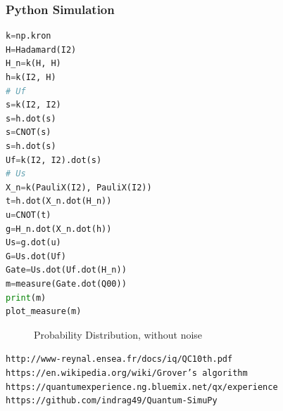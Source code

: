 \documentclass{article}
\begin{document}
\subsubsection{Python Simulation}
\begin{lstlisting}[frame=single, language=Python]
k=np.kron
H=Hadamard(I2)
H_n=k(H, H)
h=k(I2, H)
# Uf
s=k(I2, I2)
s=h.dot(s)
s=CNOT(s)
s=h.dot(s)
Uf=k(I2, I2).dot(s)
# Us
X_n=k(PauliX(I2), PauliX(I2))
t=h.dot(X_n.dot(H_n))
u=CNOT(t)
g=H_n.dot(X_n.dot(h))
Us=g.dot(u)
G=Us.dot(Uf)
Gate=Us.dot(Uf.dot(H_n))
m=measure(Gate.dot(Q00))
print(m)
plot_measure(m)
\end{lstlisting}
\begin{figure}[H]
\centering 
\noindent{}%
\caption{Probability Distribution, without noise}
\end{figure}
\begin{thebibliography}{9}
\texttt{http://www-reynal.ensea.fr/docs/iq/QC10th.pdf}
\texttt{https://en.wikipedia.org/wiki/Grover's algorithm}
\texttt{https://quantumexperience.ng.bluemix.net/qx/experience}
\texttt{https://github.com/indrag49/Quantum-SimuPy}
\end{thebibliography}
\end{document}
